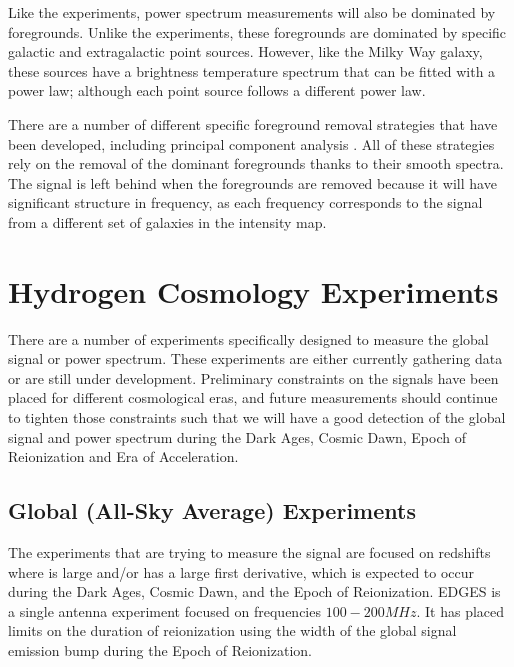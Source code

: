 Like the \avgdtb experiments, power spectrum measurements will also be dominated by foregrounds. Unlike the \avgdtb experiments, these foregrounds are dominated by specific galactic and extragalactic point sources. However, like the Milky Way galaxy, these sources have a brightness temperature spectrum that can be fitted with a power law; although each point source follows a different power law. 

There are a number of different specific foreground removal strategies that have been developed, including principal component analysis \cite{masui_2012}\cite{switzer_2013}. All of these strategies rely on the removal of the dominant foregrounds thanks to their smooth spectra. The \cm signal is left behind when the foregrounds are removed because it will have significant structure in frequency, as each frequency corresponds to  the signal from a different set of galaxies in the intensity map. 



\section{Hydrogen \cm Cosmology Experiments} \label{Sec:cm_expts}

There are a number of experiments specifically designed to measure the \cm global signal or power spectrum. These experiments are either currently gathering data or are still under development. Preliminary constraints on the \cm signals have been placed for different cosmological eras, and future measurements should continue to tighten those constraints such that we will have a good detection of the \cm global signal and power spectrum during the Dark Ages, Cosmic Dawn, Epoch of Reionization and Era of Acceleration. 


\subsection{Global (All-Sky Average) Experiments}

The experiments that are trying to measure the \avgdtb signal are focused on redshifts where \dtb is large and/or has a large first derivative, which is expected to occur during the Dark Ages, Cosmic Dawn, and the Epoch of Reionization. EDGES \cite{bowman_2008} is a single antenna experiment focused on frequencies $100-200 MHz$. It has placed limits on the duration of reionization using the width of the \cm global signal emission bump during the Epoch of Reionization. 

